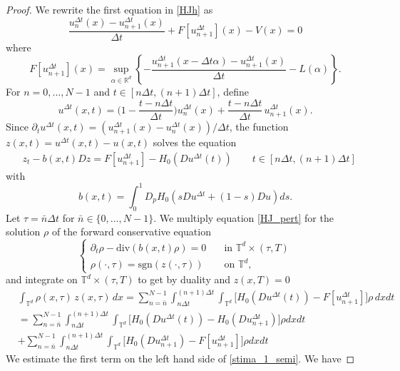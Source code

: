 \documentclass[11pt]{amsart}
\theoremstyle{remark}
\theoremstyle{definition}
\theoremstyle{Claim}
\newcommand{\T}{{\mathbb{T}}}
\newcommand{\R}{\mathbb{R}}
\theoremstyle{plain}
\newcommand{\dt}{{\Delta t}}
\begin{document}
\begin{proof}
	We rewrite the first equation in \eqref{HJh} as
	\[
		\frac{u^\dt_{n}(x)-u^\dt_{n+1}(x)}{\dt}+F[u^\dt_{n+1}](x)-V(x)=0
	\]		
where 
	\[
	F[u^\dt_{n+1}](x)=	\sup_{\alpha\in \R^d}\left\{-\frac{u^\dt_{n+1}(x-\dt \alpha)-u^\dt_{n+1}(x)}{\dt}- L(\alpha)\right\}.
	\]	
	For \(n=0,\dots,N-1\) and \(t\in[n\Delta t,(n+1)\Delta t]\), define
	\begin{equation}\label{tim_inter_semilagr}
		u^\dt(x,t)=\Big(1-\frac{t-n\Delta t}{\Delta t}\Big)u^\dt_n(x)
		+\frac{t-n\Delta t}{\Delta t}\,u^\dt_{n+1}(x).
	\end{equation}
	Since $\partial_t u^\dt(x,t)= (u^\dt_{n+1}(x)-u^\dt_{n}(x))/\dt$, the function $z(x,t)=u^\dt(x,t)-u(x,t)$    solves  the equation
	\begin{equation}\label{HJ_pert}
		\begin{split}
			&z_t - b(x,t)Dz=F[u^\dt_{n+1}]-H_0(D u^\dt(t))\qquad t\in [n\dt, (n+1)\dt] 
		\end{split}
	\end{equation}
	with 
	\[ b(x,t)=\int_0^1D_pH_{0}(sD u^\dt+(1-s)D u)ds.\]
	Let $\tau=\bar n \Delta t$ for $\bar n\in\{0, \dots,N-1\}$. We multiply   equation \eqref{HJ_pert} for  the solution $\rho$ of the forward conservative equation
	\begin{equation}\label{HJ_adjoint}
	\left\{	\begin{array}{ll}
			\partial_t \rho -\mathrm{div}(b(x,t)\rho)=0\quad &\text{in $\T^d\times (\tau,T)$}\\
			\rho(\cdot, \tau)=\mathrm{sgn}(z(\cdot, \tau))  &\text{on $\T^d$},
		\end{array}
		\right.		
	\end{equation}
 and integrate on $\mathbb{T}^d\times (\tau,T)$  to get by duality
	and $z(x,T)=0$
	\begin{equation}\label{stima_1_semi}
		\begin{split}
			&\int_{\T^d}\rho(x,\tau)\,z(x,\tau)\,dx
			= \sum_{n=\bar n}^{N-1}\int_{n\dt}^{(n+1)\dt}\int_{\T^d}\Big[H_{0}(D u^\dt(t))-F[u^\dt_{n+1}]\Big]\rho \,dxdt\\
			&=\sum_{n=\bar n}^{N-1}\int_{n\dt}^{(n+1)\dt}\int_{\T^d}\Big[H_{0}(D u^\dt(t))-H_{0}(Du^\dt_{n+1})\Big]\rho dxdt\\
			&+\sum_{n=\bar n}^{N-1}\int_{n\dt}^{(n+1)\dt}\int_{\T^d}\Big[H_{0}(Du_{n+1}^\dt)-F[u^\dt_{n+1}]\Big]\rho dxdt
		\end{split}
	\end{equation}
	We estimate the first term  on the left hand side of \eqref{stima_1_semi}. We have

\end{proof}
\end{document}
